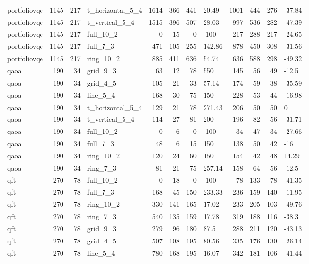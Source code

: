 \begin{longtable}{lrrlrrrlrrrl}
portfoliovqe & 1145 & 217 & t\_horizontal\_5\_4 & 1614 & 366 & 441 & 20.49 & 1001 & 444 & 276 & -37.84 \\
portfoliovqe & 1145 & 217 & t\_vertical\_5\_4 & 1515 & 396 & 507 & 28.03 & 997 & 536 & 282 & -47.39 \\
portfoliovqe & 1145 & 217 & full\_10\_2 & 0 & 15 & 0 & -100 & 217 & 288 & 217 & -24.65 \\
portfoliovqe & 1145 & 217 & full\_7\_3 & 471 & 105 & 255 & 142.86 & 878 & 450 & 308 & -31.56 \\
portfoliovqe & 1145 & 217 & ring\_10\_2 & 885 & 411 & 636 & 54.74 & 636 & 588 & 298 & -49.32 \\
qaoa & 190 & 34 & grid\_9\_3 & 63 & 12 & 78 & 550 & 145 & 56 & 49 & -12.5 \\
qaoa & 190 & 34 & grid\_4\_5 & 105 & 21 & 33 & 57.14 & 174 & 59 & 38 & -35.59 \\
qaoa & 190 & 34 & line\_5\_4 & 168 & 30 & 75 & 150 & 228 & 53 & 44 & -16.98 \\
qaoa & 190 & 34 & t\_horizontal\_5\_4 & 129 & 21 & 78 & 271.43 & 206 & 50 & 50 & 0 \\
qaoa & 190 & 34 & t\_vertical\_5\_4 & 114 & 27 & 81 & 200 & 196 & 82 & 56 & -31.71 \\
qaoa & 190 & 34 & full\_10\_2 & 0 & 6 & 0 & -100 & 34 & 47 & 34 & -27.66 \\
qaoa & 190 & 34 & full\_7\_3 & 48 & 6 & 15 & 150 & 138 & 50 & 42 & -16 \\
qaoa & 190 & 34 & ring\_10\_2 & 120 & 24 & 60 & 150 & 154 & 42 & 48 & 14.29 \\
qaoa & 190 & 34 & ring\_7\_3 & 81 & 21 & 75 & 257.14 & 158 & 64 & 56 & -12.5 \\
qft & 270 & 78 & full\_10\_2 & 0 & 18 & 0 & -100 & 78 & 133 & 78 & -41.35 \\
qft & 270 & 78 & full\_7\_3 & 168 & 45 & 150 & 233.33 & 236 & 159 & 140 & -11.95 \\
qft & 270 & 78 & ring\_10\_2 & 330 & 141 & 165 & 17.02 & 233 & 205 & 103 & -49.76 \\
qft & 270 & 78 & ring\_7\_3 & 540 & 135 & 159 & 17.78 & 319 & 188 & 116 & -38.3 \\
qft & 270 & 78 & grid\_9\_3 & 279 & 96 & 180 & 87.5 & 288 & 211 & 120 & -43.13 \\
qft & 270 & 78 & grid\_4\_5 & 507 & 108 & 195 & 80.56 & 335 & 176 & 130 & -26.14 \\
qft & 270 & 78 & line\_5\_4 & 780 & 168 & 195 & 16.07 & 342 & 181 & 106 & -41.44 \\

\end{longtable}
